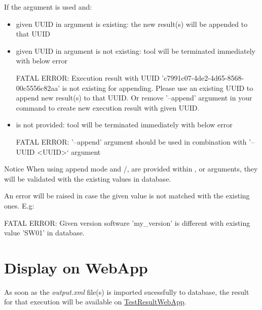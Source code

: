     If the argument  is used and:
    \begin{itemize}
      \item given UUID in  argument is existing:
            the new result(s) will be appended to that UUID
      \item given UUID in  argument is not existing:
            tool will be terminated immediately with below error
\begin{robotlog}
FATAL ERROR: Execution result with UUID 'c7991c07-4de2-4d65-8568-00c5556c82aa' is not existing for appending.
             Please use an existing UUID to append new result(s) to that UUID.
             Or remove '--append' argument in your command to create new execution result with given UUID.
\end{robotlog}
      \item {} is not provided:
            tool will be terminated immediately with below error
\begin{robotlog}
FATAL ERROR: '--append' argument should be used in combination with '--UUID <UUID>` argument
\end{robotlog}
    \end{itemize}

    \begin{boxhint} {Notice}
      When using append mode and /,
       are provided within ,
       or  arguments, they will
      be validated with the existing values in database.

      An error will be raised in case the given value is not matched with the
      existing ones. E.g:
\begin{robotlog}
FATAL ERROR: Given version software 'my_version' is different with existing value 'SW01' in database.
\end{robotlog}
    \end{boxhint}

\newpage
\hypertarget{description-display-on-webapp}{%
\section{Display on WebApp}\label{description-display-on-webapp}}

As soon as the \emph{output.xml} file(s) is imported sucessfully to database,
the result for that execution will be available on
\href{https://github.com/test-fullautomation/testresultwebapp}{TestResultWebApp}.

